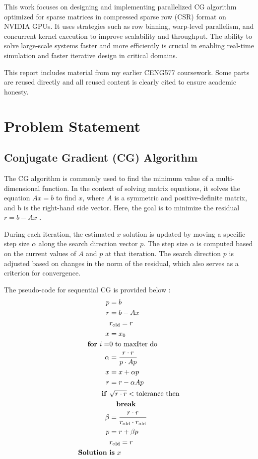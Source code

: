 \documentclass[conference]{IEEEtran}
\begin{document}
This work focuses on designing and implementing parallelized CG algorithm optimized for sparse matrices in compressed sparse row (CSR) format on NVIDIA GPUs. It uses strategies such as row binning, warp-level parallelism, and concurrent kernel execution to improve scalability and throughput. The ability to solve large-scale systems faster and more efficiently is crucial in enabling real-time simulation and faster iterative design in critical domains.

This report includes material from my earlier CENG577 coursework. Some parts are reused directly and all reused content is clearly cited to ensure academic honesty.

\section{Problem Statement}

\subsection{Conjugate Gradient (CG) Algorithm}

The CG algorithm is commonly used to find the minimum value of a multi-dimensional function. In the context of solving matrix equations, it solves the equation \(Ax = b\) to find \(x\), where \(A\) is a symmetric and positive-definite matrix, and b is the right-hand side vector. Here, the goal is to minimize the residual \( r = b - Ax \) \cite{b1}.

During each iteration, the estimated \(x\) solution is updated by moving a specific step size $\alpha$ along the search direction vector \(p\). The step size $\alpha$ is computed based on the current values of \(A\) and \(p\) at that iteration. The search direction \(p\) is adjusted based on changes in the norm of the residual, which also serves as a criterion for convergence.

The pseudo-code for sequential CG is provided below \cite{b1}:
{\tiny
\begin{align*}
p &= b \\
r &= b - Ax \\
&r_{\text{old}} = r \\
x &= x_0 \\
\text{\textbf{for} } i = &0 \text{ to maxIter do} \\
\alpha &= \frac{r \cdot r}{p \cdot Ap} \\
x &= x + \alpha p \\
r &= r - \alpha Ap \\
\text{\textbf{if} } &\sqrt{r \cdot r} < \text{tolerance then} \\
&\text{\quad\textbf{break}}  \\
\beta &= \frac{r \cdot r}{r_{\text{old}} \cdot r_{\text{old}}} \\
p &= r + \beta p \\
&r_{\text{old}} = r \\
\text{\textbf{Solution} } & \text{\textbf{is} } x
\end{align*}
}
\end{document}

